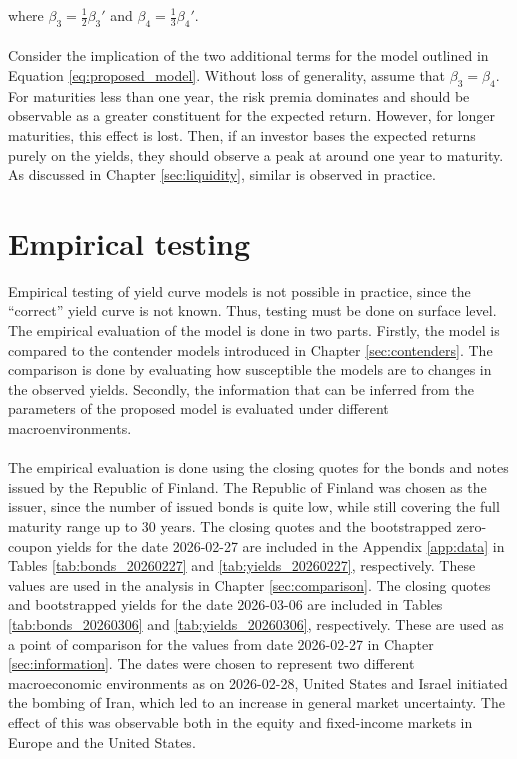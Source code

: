 \documentclass[a4paper]{artikel3}
\numberwithin{equation}{section}
\numberwithin{theorem}{section}
\numberwithin{proposition}{section}
\numberwithin{lemma}{section}
\begin{document}
where $\beta_3 = \frac{1}{2}\beta_3'$ and  $\beta_4 = \frac{1}{3}\beta_4'$. \\
\\
Consider the implication of the two additional terms for the model outlined in Equation \eqref{eq:proposed_model}. Without loss of generality, assume that $\beta_3 = \beta_4$. For maturities less than one year, the risk premia dominates and should be observable as a greater constituent for the expected return. However, for longer maturities, this effect is lost. Then, if an investor bases the expected returns purely on the yields, they should observe a peak at around one year to maturity. As discussed in Chapter \ref{sec:liquidity}, similar is observed in practice.


\clearpage


\section{Empirical testing}
\label{sec:tests}


Empirical testing of yield curve models is not possible in practice, since the ``correct'' yield curve is not known. Thus, testing must be done on surface level. The empirical evaluation of the model is done in two parts. Firstly, the model is compared to the contender models introduced in Chapter \ref{sec:contenders}. The comparison is done by evaluating how susceptible the models are to changes in the observed yields. Secondly, the information that can be inferred from the parameters of the proposed model is evaluated under different macroenvironments. \\
\\
The empirical evaluation is done using the closing quotes for the bonds and notes issued by the Republic of Finland. The Republic of Finland was chosen as the issuer, since the number of issued bonds is quite low, while still covering the full maturity range up to 30 years. The closing quotes and the bootstrapped zero-coupon yields for the date 2026-02-27 are included in the Appendix \ref{app:data} in Tables \ref{tab:bonds_20260227} and \ref{tab:yields_20260227}, respectively. These values are used in the analysis in Chapter \ref{sec:comparison}. The closing quotes and bootstrapped yields for the date 2026-03-06 are included in Tables \ref{tab:bonds_20260306} and \ref{tab:yields_20260306}, respectively. These are used as a point of comparison for the values from date 2026-02-27 in Chapter \ref{sec:information}. The dates were chosen to represent two different macroeconomic environments as on 2026-02-28, United States and Israel initiated the bombing of Iran, which led to an increase in general market uncertainty. The effect of this was observable both in the equity and fixed-income markets in Europe and the United States.
\end{document}
